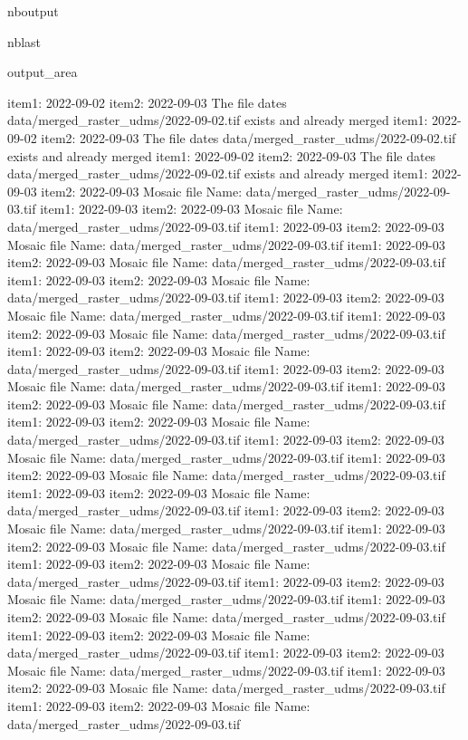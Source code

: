 \documentclass[letterpaper,10pt]{sphinxmanual}
\begin{document}
\begin{sphinxuseclass}{nboutput}
\begin{sphinxuseclass}{nblast}
{\begin{sphinxuseclass}{output_area}
\begin{sphinxuseclass}{}
\begin{sphinxVerbatim}[commandchars=\\\{\}]
item1:  2022-09-02
item2:  2022-09-03
The file dates data/merged\_raster\_udms/2022-09-02.tif exists and already merged
item1:  2022-09-02
item2:  2022-09-03
The file dates data/merged\_raster\_udms/2022-09-02.tif exists and already merged
item1:  2022-09-02
item2:  2022-09-03
The file dates data/merged\_raster\_udms/2022-09-02.tif exists and already merged
item1:  2022-09-03
item2:  2022-09-03
Mosaic file Name:  data/merged\_raster\_udms/2022-09-03.tif
item1:  2022-09-03
item2:  2022-09-03
Mosaic file Name:  data/merged\_raster\_udms/2022-09-03.tif
item1:  2022-09-03
item2:  2022-09-03
Mosaic file Name:  data/merged\_raster\_udms/2022-09-03.tif
item1:  2022-09-03
item2:  2022-09-03
Mosaic file Name:  data/merged\_raster\_udms/2022-09-03.tif
item1:  2022-09-03
item2:  2022-09-03
Mosaic file Name:  data/merged\_raster\_udms/2022-09-03.tif
item1:  2022-09-03
item2:  2022-09-03
Mosaic file Name:  data/merged\_raster\_udms/2022-09-03.tif
item1:  2022-09-03
item2:  2022-09-03
Mosaic file Name:  data/merged\_raster\_udms/2022-09-03.tif
item1:  2022-09-03
item2:  2022-09-03
Mosaic file Name:  data/merged\_raster\_udms/2022-09-03.tif
item1:  2022-09-03
item2:  2022-09-03
Mosaic file Name:  data/merged\_raster\_udms/2022-09-03.tif
item1:  2022-09-03
item2:  2022-09-03
Mosaic file Name:  data/merged\_raster\_udms/2022-09-03.tif
item1:  2022-09-03
item2:  2022-09-03
Mosaic file Name:  data/merged\_raster\_udms/2022-09-03.tif
item1:  2022-09-03
item2:  2022-09-03
Mosaic file Name:  data/merged\_raster\_udms/2022-09-03.tif
item1:  2022-09-03
item2:  2022-09-03
Mosaic file Name:  data/merged\_raster\_udms/2022-09-03.tif
item1:  2022-09-03
item2:  2022-09-03
Mosaic file Name:  data/merged\_raster\_udms/2022-09-03.tif
item1:  2022-09-03
item2:  2022-09-03
Mosaic file Name:  data/merged\_raster\_udms/2022-09-03.tif
item1:  2022-09-03
item2:  2022-09-03
Mosaic file Name:  data/merged\_raster\_udms/2022-09-03.tif
item1:  2022-09-03
item2:  2022-09-03
Mosaic file Name:  data/merged\_raster\_udms/2022-09-03.tif
item1:  2022-09-03
item2:  2022-09-03
Mosaic file Name:  data/merged\_raster\_udms/2022-09-03.tif
item1:  2022-09-03
item2:  2022-09-03
Mosaic file Name:  data/merged\_raster\_udms/2022-09-03.tif
item1:  2022-09-03
item2:  2022-09-03
Mosaic file Name:  data/merged\_raster\_udms/2022-09-03.tif
item1:  2022-09-03
item2:  2022-09-03
Mosaic file Name:  data/merged\_raster\_udms/2022-09-03.tif
item1:  2022-09-03
item2:  2022-09-03
Mosaic file Name:  data/merged\_raster\_udms/2022-09-03.tif
item1:  2022-09-03
item2:  2022-09-03
Mosaic file Name:  data/merged\_raster\_udms/2022-09-03.tif

\end{sphinxVerbatim}
\end{sphinxuseclass}
\end{sphinxuseclass}}
\end{sphinxuseclass}
\end{sphinxuseclass}
\end{document}
